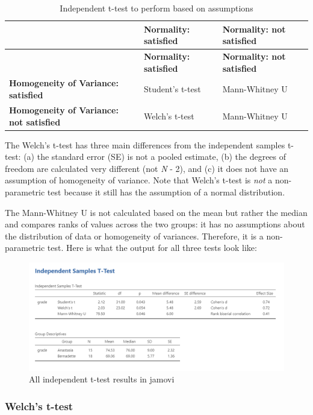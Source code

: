 \documentclass[
]{book}
\begin{document}
\begin{longtable}[]{@{}lll@{}}
\caption{Independent t-test to perform based on assumptions}\tabularnewline
\toprule
& \textbf{Normality: satisfied} & \textbf{Normality: not satisfied}\tabularnewline
\midrule
\endfirsthead
\toprule
& \textbf{Normality: satisfied} & \textbf{Normality: not satisfied}\tabularnewline
\midrule
\endhead
\textbf{Homogeneity of Variance: satisfied} & Student's t-test & Mann-Whitney U\tabularnewline
\textbf{Homogeneity of Variance: not satisfied} & Welch's t-test & Mann-Whitney U\tabularnewline
\bottomrule
\end{longtable}

The Welch's t-test has three main differences from the independent samples t-test: (a) the standard error (SE) is not a pooled estimate, (b) the degrees of freedom are calculated very different (not \emph{N} - 2), and (c) it does not have an assumption of homogeneity of variance. Note that Welch's t-test is \emph{not} a non-parametric test because it still has the assumption of a normal distribution.

The Mann-Whitney U is not calculated based on the mean but rather the median and compares ranks of values across the two groups: it has no assumptions about the distribution of data or homogeneity of variances. Therefore, it is a non-parametric test. Here is what the output for all three tests look like:

\begin{figure}

{\centering \includegraphics[width=1\linewidth]{images/02-independent_t-test/independent_t-test_full-results} 

}

\caption{All independent t-test results in jamovi}\label{fig:unnamed-chunk-11}
\end{figure}

\hypertarget{welchs-t-test}{%
\subsubsection{Welch's t-test}\label{welchs-t-test}}
\end{document}

